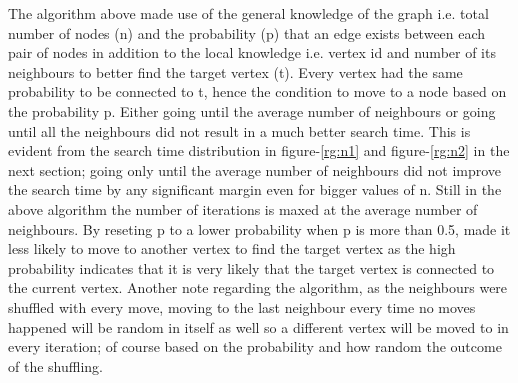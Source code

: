 \documentclass[11pt,a4paper,notitlepage]{article}
\begin{document}
The algorithm above made use of the general knowledge of the graph i.e. total number of nodes (n) and the probability (p) that an edge exists between each pair of nodes in addition to the local knowledge i.e. vertex id and number of its neighbours to better find the target vertex (t). Every vertex had the same probability to be connected to t, hence the condition to move to a node based on the probability p. Either going until the average number of neighbours or going until all the neighbours did not result in a much better search time. This is evident from the search time distribution in figure-\ref{rg:n1} and figure-\ref{rg:n2} in the next section; going only until the average number of neighbours did not improve the search time by any significant margin even for bigger values of n. Still in the above algorithm the number of iterations is maxed at the average number of neighbours. By reseting p to a lower probability when p is more than 0.5, made it less likely to move to another vertex to find the target vertex as the high probability indicates that it is very likely that the target vertex is connected to the current vertex. Another note regarding the algorithm, as the neighbours were shuffled with every move, moving to the last neighbour every time no moves happened will be random in itself as well so a different vertex will be moved to in every iteration; of course based on the probability and how random the outcome of the shuffling.
\end{document}
